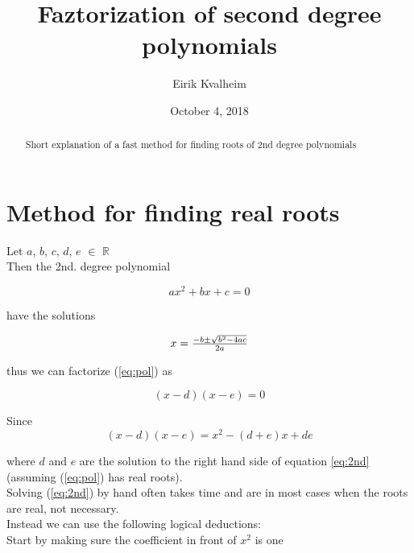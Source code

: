 \documentclass[a4paper]{article}
\title{Faztorization of second degree polynomials}
\author{Eirik Kvalheim}
\date{October 4, 2018}
\newcommand{\R}{\mathbb{R}}
\begin{document}
\maketitle

\begin{abstract}
Short explanation of a fast method for finding roots of 2nd degree polynomials
\end{abstract}

\section{Method for finding real roots}
\label{sec:introduction}

Let $a$, $b$, $c$, $d$, $e$ $\in$ $\R$\\
Then the 2nd. degree polynomial

\begin{equation}  \label{eq:pol}
	ax^2 + bx + c = 0
\end{equation}

have the solutions

\begin{equation} \label{eq:2nd}
	\begin{array}
		{*{20}c} {x = \frac{{ - b \pm \sqrt {b^2 - 4ac} }}{{2a}}} \\ 
	\end{array}
\end{equation}

thus we can factorize (\ref{eq:pol}) as

\begin{equation} \label{eq:fac}
 (x-d)(x-e) = 0
\end{equation}

Since
\begin{equation} \label{eq:Chr}
	 (x-d)(x-e)=x^2-(d+e)x+de
\end{equation}

where $d$ and $e$ are the solution to the right hand side of equation \ref{eq:2nd} (assuming (\ref{eq:pol}) has real roots).\\ \newline Solving
(\ref{eq:2nd}) by hand often takes time and are in most cases when the roots are real, not necessary.\\
Instead we can use the following logical deductions:\\

Start by making sure the coefficient in front of $x^2$ is one
\end{document}

